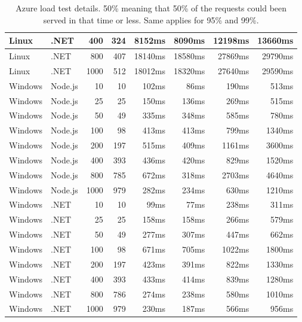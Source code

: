 \begin{table}[h]
\begin{tabular}{|l|l|r|r|r|r|r|r|}
Linux	&	.NET	&	400	&	324	&	8152ms	&	8090ms	&	12198ms	&	13660ms	\\ \hline
Linux	&	.NET	&	800	&	407	&	18140ms	&	18580ms	&	27869ms	&	29790ms	\\ \hline
Linux	&	.NET	&	1000	&	512	&	18012ms	&	18320ms	&	27640ms	&	29590ms	\\ \hline
Windows	&	Node.js	&	10	&	10	&	102ms	&	86ms	&	190ms	&	513ms	\\ \hline
Windows	&	Node.js	&	25	&	25	&	150ms	&	136ms	&	269ms	&	515ms	\\ \hline
Windows	&	Node.js	&	50	&	49	&	335ms	&	348ms	&	585ms	&	780ms	\\ \hline
Windows	&	Node.js	&	100	&	98	&	413ms	&	413ms	&	799ms	&	1340ms	\\ \hline
Windows	&	Node.js	&	200	&	197	&	515ms	&	409ms	&	1161ms	&	3600ms	\\ \hline
Windows	&	Node.js	&	400	&	393	&	436ms	&	420ms	&	829ms	&	1520ms	\\ \hline
Windows	&	Node.js	&	800	&	785	&	672ms	&	318ms	&	2703ms	&	4640ms	\\ \hline
Windows	&	Node.js	&	1000	&	979	&	282ms	&	234ms	&	630ms	&	1210ms	\\ \hline
Windows	&	.NET	&	10	&	10	&	99ms	&	77ms	&	238ms	&	311ms	\\ \hline
Windows	&	.NET	&	25	&	25	&	158ms	&	158ms	&	266ms	&	579ms	\\ \hline
Windows	&	.NET	&	50	&	49	&	277ms	&	307ms	&	447ms	&	662ms	\\ \hline
Windows	&	.NET	&	100	&	98	&	671ms	&	705ms	&	1022ms	&	1800ms	\\ \hline
Windows	&	.NET	&	200	&	197	&	423ms	&	391ms	&	822ms	&	1330ms	\\ \hline
Windows	&	.NET	&	400	&	393	&	433ms	&	414ms	&	839ms	&	1280ms	\\ \hline
Windows	&	.NET	&	800	&	786	&	274ms	&	238ms	&	580ms	&	1010ms	\\ \hline
Windows	&	.NET	&	1000	&	979	&	230ms	&	187ms	&	566ms	&	956ms	\\ \hline
    \end{tabular}
    \caption[Azure load test details]{Azure load test details. 50\% meaning that 50\% of the requests could been served in that time or less. Same applies for 95\% and 99\%.}
    \label{table:azure_load_test}
\end{table}

